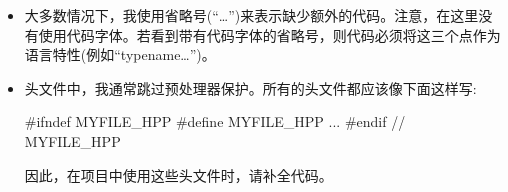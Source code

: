 \begin{itemize}
\item
大多数情况下，我使用省略号(“…”)来表示缺少额外的代码。注意，在这里没有使用代码字体。若看到带有代码字体的省略号，则代码必须将这三个点作为语言特性(例如“typename…”)。

\item
头文件中，我通常跳过预处理器保护。所有的头文件都应该像下面这样写:

\begin{cpp}
#ifndef MYFILE_HPP
#define MYFILE_HPP
...
#endif // MYFILE_HPP
\end{cpp}

因此，在项目中使用这些头文件时，请补全代码。
\end{itemize}














